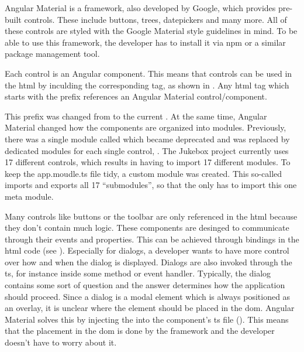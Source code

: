 

Angular Material is a framework, also developed by Google, which provides pre-built controls. These include buttons, trees, datepickers and many more. All of these controls are styled with the Google Material style guidelines in mind. To be able to use this framework, the developer has to install it via \gls{npm} or a similar package management tool. \cite{angularMaterial}

Each control is an Angular component. This means that controls can be used in the \gls{html} by inculding the corresponding tag, as shown in . Any \gls{html} tag which starts with the  prefix references an Angular Material control/component.

This prefix was changed from  to the current . At the same time, Angular Material changed how the components are organized into modules. Previously, there was a single module called  which became deprecated and was replaced by dedicated modules for each single control, \zB {}. The Jukebox project currently uses 17 different controls, which results in having to import 17 different modules. To keep the app.moudle.ts file tidy, a custom module was created. This so-called  imports and exports all 17 \enquote{submodules}, so that the  only has to import this one meta module.


Many controls like buttons or the toolbar are only referenced in the \gls{html} because they don't contain much logic. These components are desinged to communicate through their events and properties. This can be achieved through bindings in the \gls{html} code (see ). Especially for dialogs, a developer wants to have more control over how and when the dialog is displayed. Dialogs are also invoked through the \gls{ts}, for instance inside some method or event handler. Typically, the dialog contains some sort of question and the answer determines how the application should proceed. Since a dialog is a modal element which is always positioned as an overlay, it is unclear where the element should be placed in the \gls{dom}. Angular Material solves this by injecting the  into the component's \gls{ts} file (). This means that the placement in the \gls{dom} is done by the framework and the developer doesn't have to worry about it.

